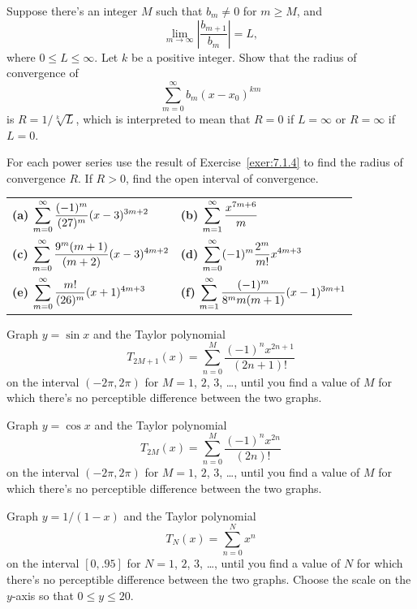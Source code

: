 \begin{exerciselist}
  \item\label{exer:7.1.4} Suppose there's an integer $M$ such that $b_{m}\ne0$ for $m\ge M$, and
  \[
    \lim_{m\to\infty}\left|\frac{b_{m+1}}{b_{m}}\right|=L,
  \]
  where $0\le L\le\infty$. Let $k$ be a positive integer. Show that the radius of convergence of
  \[
    \sum_{m=0}^{\infty}b_{m}(x-x_{0})^{km}
  \]
  is $R=1/\sqrt[k]{L}$, which is interpreted to mean that $R=0$ if $L=\infty$ or $R=\infty$ if
  $L=0$. 

  \item\label{exer:7.1.5} For each power series use the result of Exercise~\ref{exer:7.1.4} to find
        the radius of convergence $R$. If $R>0$, find the open interval of convergence.

  \begin{tabular}[t]{@{}p{168pt}@{}p{168pt}}
    {\bf (a)} $\displaystyle{\sum_{m=0}^{\infty}\frac{(-1)^{m}}{(27)^{m}}(x-3)^{3m+2}}$ & {\bf (b)} $\displaystyle{\sum_{m=1}^{\infty}\frac{x^{7m+6}}{m}}$                       \\
    {\bf (c)} $\displaystyle{\sum_{m=0}^{\infty}\frac{9^{m}(m+1)}{(m+2)}(x-3)^{4m+2}}$  & {\bf (d)} $\displaystyle{\sum_{m=0}^{\infty}(-1)^{m}\frac{2^{m}}{m!}x^{4m+3}}$         \\
    {\bf (e)} $\displaystyle{\sum_{m=0}^{\infty}\frac{m!}{(26)^{m}}(x+1)^{4m+3}}$       & {\bf (f)} $\displaystyle{\sum_{m=1}^{\infty}\frac{(-1)^{m}}{8^{m}m(m+1)}(x-1)^{3m+1}}$
  \end{tabular}

  \item\label{exer:7.1.6} \Lex Graph $y=\sin x$ and the Taylor polynomial
  \[
    T_{2M+1}(x)=\sum_{n=0}^{M}\frac{(-1)^{n}x^{2n+1}}{(2n+1)!}
  \]
  on the interval $(-2\pi,2\pi)$ for $M=1$, $2$, $3$, \dots, until you find a value of $M$ for which
  there's no perceptible difference between the two graphs.

  \item\label{exer:7.1.7} \Lex Graph $y=\cos x$ and the Taylor polynomial
  \[
    T_{2M}(x)=\sum_{n=0}^{M}\frac{(-1)^{n}x^{2n}}{(2n)!}
  \]
  on the interval $(-2\pi,2\pi)$ for $M=1$, $2$, $3$, \dots, until you find a value of $M$ for which
  there's no perceptible difference between the two graphs.

  \item\label{exer:7.1.8} \Lex Graph $y=1/(1-x)$ and the Taylor polynomial
  \[
    T_{N}(x)=\sum_{n=0}^{N}x^{n}
  \]
  on the interval $[0,.95]$ for $N=1$, $2$, $3$, \dots, until you find a value of $N$ for which
  there's no perceptible difference between the two graphs. Choose the scale on the $y$-axis so that
  $0\le y\le20$.


\end{exerciselist}
